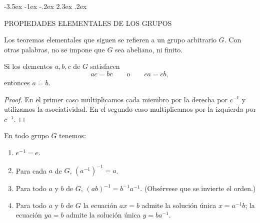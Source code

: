 \documentclass[12pt,a4paper]{book}
\makeatletter
\renewcommand\section{\@startsection{section}{1}{\z@}%
  {-3.5ex \@plus -1ex \@minus -.2ex}%
  {2.3ex \@plus .2ex}%
  {\normalfont\Large\bfseries\raggedright}}
\makeatother
\begin{document}
    \section{PROPIEDADES ELEMENTALES DE LOS GRUPOS}

    Los teoremas elementales que siguen se refieren a un grupo arbitrario $G$. Con otras
    palabras, no se impone que $G$ sea abeliano, ni finito.

    \begin{teorema}
        Si los elementos $a,b,c$ de $G$ satisfacen
        \begin{equation*}
            ac=bc\qquad\text{o}\qquad ca=cb,
        \end{equation*}
        entonces $a=b$.
    \end{teorema}

    \begin{proof}
        En el primer caso multiplicamos cada miembro por la derecha por $c^{-1}$ y
        utilizamos la asociatividad. En el segundo caso multiplicamos por la izquierda por
        $c^{-1}$.
    \end{proof}

    \begin{teorema}
        En todo grupo $G$ tenemos:
        \begin{enumerate}
            \item[(a)] $e^{-1}=e$.
            \item[(b)] Para cada $a$ de $G$, $(a^{-1})^{-1}=a$.
            \item[(c)] Para todo $a$ y $b$ de $G$, $(ab)^{-1}=b^{-1}a^{-1}$. (Obsérvese que
            se invierte el orden.)
            \item[(d)] Para todo $a$ y $b$ de $G$ la ecuación $ax=b$ admite la solución
            única $x=a^{-1}b$; la ecuación $ya=b$ admite la solución única $y=ba^{-1}$.
        \end{enumerate}
    \end{teorema}
\end{document}
